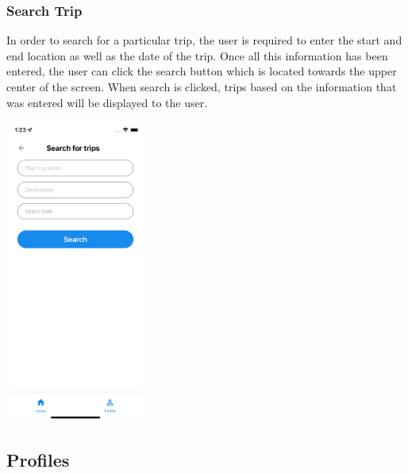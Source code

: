 \documentclass[hidelinks, 12pt, a4paper]{article}
\begin{document}
\subsubsection{Search Trip}
  In order to search for a particular trip, the user is required to enter the start and end location as well as the date of the trip. Once all this information has been entered, the user can click the search button which is located towards the upper center of the screen. When search is clicked, trips based on the information that was entered will be displayed to the user.
\begin{center}
  \includegraphics[height=10cm]{images/search_trips.png}
\end{center}
\vspace{1cm}

\subsection{Profiles}
\end{document}
